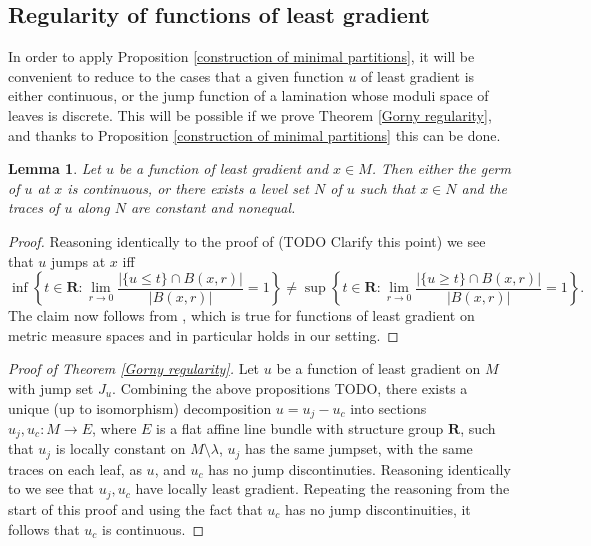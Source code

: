 \documentclass[reqno,11pt]{amsart}
\newcommand{\RR}{\mathbf{R}}
\newtheorem{lemma}[theorem]{Lemma}
\theoremstyle{definition}
\numberwithin{equation}{section}
\begin{document}
\subsection{Regularity of functions of least gradient}
In order to apply Proposition \ref{construction of minimal partitions}, it will be convenient to reduce to the cases that a given function $u$ of least gradient is either continuous, or the jump function of a lamination whose moduli space of leaves is discrete.
This will be possible if we prove Theorem \ref{Gorny regularity}, and thanks to Proposition \ref{construction of minimal partitions} this can be done.

\begin{lemma}
Let $u$ be a function of least gradient and $x \in M$. Then either the germ of $u$ at $x$ is continuous, or there exists a level set $N$ of $u$ such that $x \in N$ and the traces of $u$ along $N$ are constant and nonequal.
\end{lemma}
\begin{proof}
Reasoning identically to the proof of \cite[Proposition 3.9]{górny2017planar} (TODO Clarify this point) we see that $u$ jumps at $x$ iff
$$\inf\left\{t \in \RR: \lim_{r \to 0} \frac{|\{u \leq t\} \cap B(x, r)|}{|B(x, r)|} = 1\right\} \neq \sup\left\{t \in \RR: \lim_{r \to 0} \frac{|\{u \geq t\} \cap B(x, r)|}{|B(x, r)|} = 1\right\}.$$
The claim now follows from \cite[Theorem 4.1]{HakkarainenKorteLahtiShanmugalingam+2015}, which is true for functions of least gradient on metric measure spaces and in particular holds in our setting.
\end{proof}

\begin{proof}[Proof of Theorem \ref{Gorny regularity}]
Let $u$ be a function of least gradient on $M$ with jump set $J_u$.
Combining the above propositions TODO, there exists a unique (up to isomorphism) decomposition $u = u_j - u_c$ into sections $u_j, u_c: M \to E$, where $E$ is a flat affine line bundle with structure group $\RR$, such that $u_j$ is locally constant on $M \setminus \lambda$, $u_j$ has the same jumpset, with the same traces on each leaf, as $u$, and $u_c$ has no jump discontinuties.
Reasoning identically to \cite[pg11]{górny2017planar} we see that $u_j, u_c$ have locally least gradient.
Repeating the reasoning from the start of this proof and using the fact that $u_c$ has no jump discontinuities, it follows that $u_c$ is continuous.
\end{proof}

\end{document}
